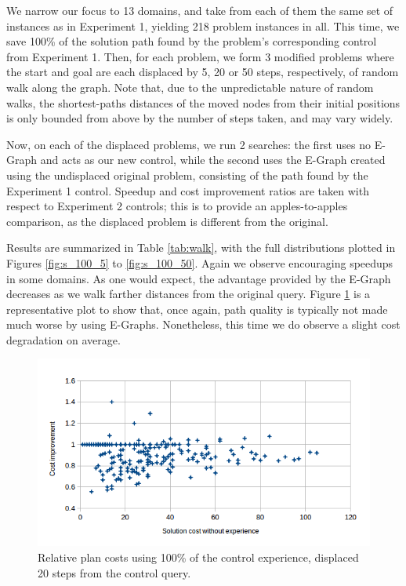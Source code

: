 \documentclass[letterpaper]{article}
\begin{document}
We narrow our focus to 13 domains, and take from each of them the same set of instances as in Experiment 1, yielding 218 problem instances in all.
This time, we save 100\% of the solution path found by the problem's corresponding control from Experiment 1.
Then, for each problem, we form 3 modified problems where the start and goal are each displaced by 5, 20 or 50 steps, respectively, of random walk along the graph.
Note that, due to the unpredictable nature of random walks, the shortest-paths distances of the moved nodes from their initial positions is only bounded from above by the number of steps taken, and may vary widely.

Now, on each of the displaced problems, we run 2 searches: the first uses no E-Graph and acts as our new control, while the second uses the E-Graph created using the undisplaced original problem, consisting of the path found by the Experiment 1 control. Speedup and cost improvement ratios are taken with respect to Experiment 2 controls; this is to provide an apples-to-apples comparison, as the displaced problem is different from the original.

Results are summarized in Table \ref{tab:walk}, with the full distributions plotted in Figures \ref{fig:s_100_5} to \ref{fig:s_100_50}.
Again we observe encouraging speedups in some domains. As one would expect, the advantage provided by the E-Graph decreases as we walk farther distances from the original query. Figure \ref{fig:c_100_20} is a representative plot to show that, once again, path quality is typically not made much worse by using E-Graphs. Nonetheless, this time we do observe a slight cost degradation on average.

\begin{figure}
	\centering
	\includegraphics[scale=0.5]{Cost_100_20.png}
	\caption{Relative plan costs using 100\% of the control experience, displaced 20 steps from the control query.}
	 \label{fig:c_100_20}
\end{figure}
\end{document}
